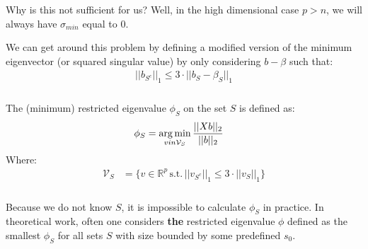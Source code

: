 \begin{frame}[fragile] \frametitle{}

Why is this not sufficient for us? Well, in the high dimensional case $p > n$, we will
always have $\sigma_{min}$ equal to $0$.

\pause We can get around this problem by defining a modified version of the minimum
eigenvector (or squared singular value) by only considering $b - \beta$ such that:
\begin{align*}
|| b_{S^c} ||_1 \leq 3 \cdot || b_S - \beta_S ||_1
\end{align*}

\end{frame}

\begin{frame}[fragile] \frametitle{}

The (minimum) restricted eigenvalue $\phi_S$ on the set $S$ is defined as:
\begin{align*}
\phi_S &= \mathop{\mathrm{arg\,min}}_{v in \mathcal{V}_S} \frac{|| X b ||_2}{|| b ||_2}
\end{align*}
Where:
\begin{align*}
\mathcal{V}_S &= \{ v \in \mathbb{R}^p \, \text{s.t.} \, || v_{S^c} ||_1 \leq 3 \cdot || v_S ||_1  \}
\end{align*}

\end{frame}

\begin{frame}[fragile] \frametitle{}

Because we do not know $S$, it is impossible to calculate $\phi_S$ in practice.
In theoretical work, often one considers \textbf{the} restricted eigenvalue
$\phi$ defined as the smallest $\phi_S$ for all sets $S$ with size bounded by
some predefined $s_0$.

\end{frame}

